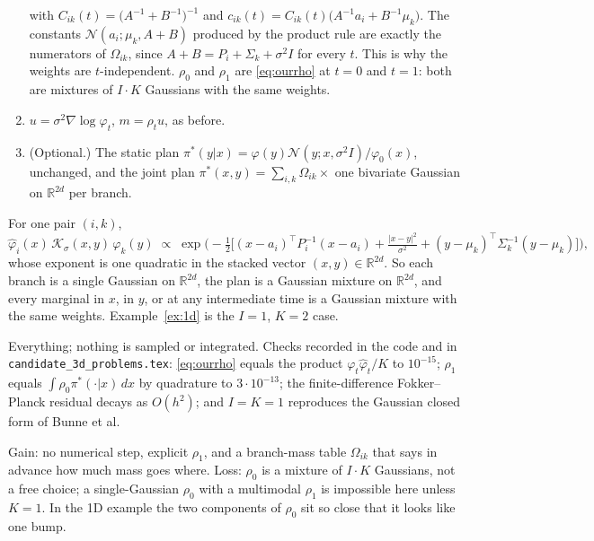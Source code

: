 \documentclass[11pt]{article}
\newcommand{\code}[1]{\texttt{#1}}
\newcommand{\R}{\mathbb{R}}
\newcommand{\Nc}{\mathcal{N}}
\newcommand{\Kc}{\mathcal{K}}
\newcommand{\hphi}{\hat\varphi}
\theoremstyle{definition}
\theoremstyle{plain}
\begin{document}
\begin{description}[leftmargin=1.5em,itemsep=2pt]
\begin{enumerate}[itemsep=1pt]
\begin{equation}
            \end{equation}
            with $C_{ik}(t)=\big(A^{-1}+B^{-1}\big)^{-1}$ and
            $c_{ik}(t)=C_{ik}(t)\big(A^{-1}a_i+B^{-1}\mu_k\big)$.
            The constants $\Nc(a_i;\mu_k,A+B)$ produced by the product rule are exactly the
            numerators of $\Omega_{ik}$, since $A+B=P_i+\Sigma_k+\sigma^2I$ for every $t$. This is
            why the weights are $t$-independent. $\rho_0$ and $\rho_1$ are \eqref{eq:ourrho} at
            $t=0$ and $t=1$: both are mixtures of $I\!\cdot\!K$ Gaussians with the same weights.
      \item $u=\sigma^2\nabla\log\varphi_t$, $m=\rho_tu$, as before.
      \item (Optional.) The static plan $\pi^*(y|x)=\varphi(y)\Nc(y;x,\sigma^2I)/\varphi_0(x)$,
            unchanged, and the joint plan $\pi^*(x,y)=\sum_{i,k}\Omega_{ik}\times$ one
            bivariate Gaussian on $\R^{2d}$ per branch.
    \end{enumerate}
  \item[Why it all closes.] For one pair $(i,k)$,
    \[
      \hphi_i(x)\,\Kc_\sigma(x,y)\,\varphi_k(y)\;\propto\;
      \exp\!\Big(-\tfrac12\Big[(x-a_i)^{\!\top}P_i^{-1}(x-a_i)
      +\tfrac{|x-y|^2}{\sigma^2}+(y-\mu_k)^{\!\top}\Sigma_k^{-1}(y-\mu_k)\Big]\Big),
    \]
    whose exponent is one quadratic in the stacked vector $(x,y)\in\R^{2d}$. So each branch is a
    single Gaussian on $\R^{2d}$, the plan is a Gaussian mixture on $\R^{2d}$, and every marginal
    in $x$, in $y$, or at any intermediate time is a Gaussian mixture with the same weights.
    Example~\ref{ex:1d} is the $I=1$, $K=2$ case.
  \item[What is exact.] Everything; nothing is sampled or integrated. Checks recorded in the
    code and in \code{candidate\_3d\_problems.tex}: \eqref{eq:ourrho} equals the product
    $\varphi_t\hphi_t/K$ to $10^{-15}$; $\rho_1$ equals $\int\rho_0\pi^*(\cdot|x)\,dx$ by
    quadrature to $3\cdot10^{-13}$; the finite-difference Fokker--Planck residual decays as
    $O(h^2)$; and $I=K=1$ reproduces the Gaussian closed form of Bunne et al.
  \item[Gain and loss.] Gain: no numerical step, explicit $\rho_1$, and a branch-mass table
    $\Omega_{ik}$ that says in advance how much mass goes where. Loss: $\rho_0$ is a mixture
    of $I\!\cdot\!K$ Gaussians, not a free choice; a single-Gaussian $\rho_0$ with a
    multimodal $\rho_1$ is impossible here unless $K=1$. In the 1D example the two components of
    $\rho_0$ sit so close that it looks like one bump.
\end{description}
\end{document}
